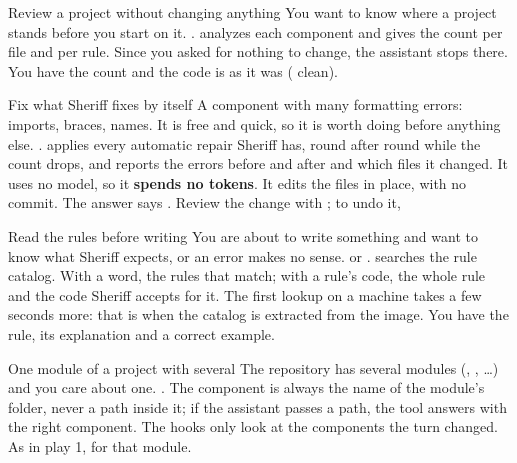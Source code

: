 \documentclass[11pt,a4paper]{article}
\begin{document}
\begin{play}{Review a project without changing anything}
\when You want to know where a project stands before you start on it.
\asks {}.
\happens {} analyzes each component and gives the count per
file and per rule. Since you asked for nothing to change, the assistant stops
there.
\done You have the count and the code is as it was ( clean).
\end{play}

\begin{play}{Fix what Sheriff fixes by itself}
\when A component with many formatting errors: imports, braces, names. It is
free and quick, so it is worth doing before anything else.
\asks {}.
\happens {} applies every automatic repair Sheriff has, round
after round while the count drops, and reports the errors before and after and
which files it changed. It uses no model, so it \textbf{spends no tokens}. It
edits the files in place, with no commit.
\done The answer says . Review the change with
; to undo it, 
\end{play}

\begin{play}{Read the rules before writing}
\when You are about to write something and want to know what Sheriff expects,
or an error makes no sense.
\asks {} or .
\happens {} searches the rule catalog. With a word, the
rules that match; with a rule's code, the whole rule and the code Sheriff
accepts for it. The first lookup on a machine takes a few seconds more: that is
when the catalog is extracted from the image.
\done You have the rule, its explanation and a correct example.
\end{play}

\begin{play}{One module of a project with several}
\when The repository has several modules (, ,
\ldots) and you care about one.
\asks {}.
\happens The component is always the name of the module's folder, never a path
inside it; if the assistant passes a path, the tool answers with the right
component. The hooks only look at the components the turn changed.
\done As in play 1, for that module.
\end{play}
\end{document}
